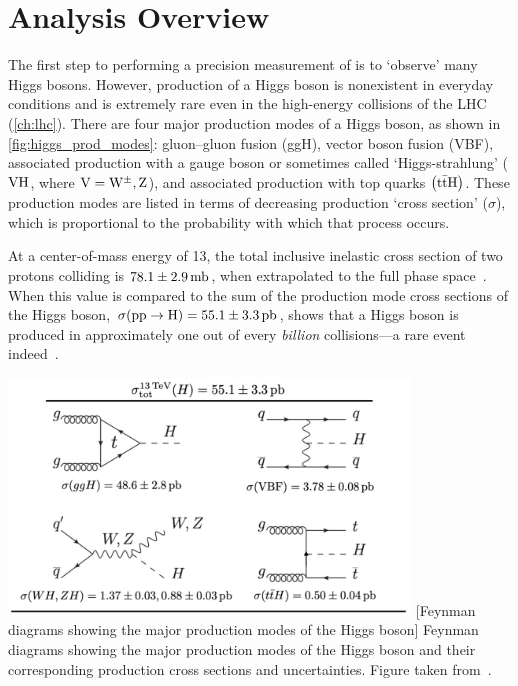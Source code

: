 \section{Analysis Overview}
\label{sec:analysis_overview}
The first step to performing a precision measurement of \mH is to `observe' many Higgs bosons.
However, production of a Higgs boson is nonexistent in everyday conditions and is extremely rare even in the high-energy \pp collisions of the LHC (\cref{ch:lhc}).
There are four major production modes of a Higgs boson, as shown in \cref{fig:higgs_prod_modes}:
gluon--gluon fusion (ggH),
vector boson fusion (VBF),
associated production with a gauge boson or sometimes called `Higgs-strahlung' ($\mathrm{V} \mathrm{H}$, where $\mathrm{V} = \mathrm{W}^\pm, \text{Z}$),
and associated production with top quarks $\left( \mathrm{t} \bar{\mathrm{t}} \mathrm{H} \right)$.
These production modes are listed in terms of decreasing production `cross section' ($\sigma$), which is proportional to the probability with which that process occurs.

At a center-of-mass energy of 13\TeV, the total inclusive inelastic cross section of two protons colliding is $78.1 \pm 2.9\,\text{mb}$, when extrapolated to the full phase space~\cite{ATLAS:2016ygv}.
When this value is compared to the sum of the production mode cross sections of the Higgs boson, $\sigma(\mathrm{p} \mathrm{p} \to \mathrm{H}) = 55.1 \pm 3.3\,\text{pb}$, shows that a Higgs boson is produced in approximately one out of every \emph{billion} \pp collisions---a rare event indeed~\cite{new_pdg_2022}.
\begin{multiFigure}
	\centering
		\includegraphics[width=0.8\textwidth]{figures/higgsmassmeas/higgs_prod_modes.png}
		[Feynman diagrams showing the major production modes of the Higgs boson]
		{Feynman diagrams showing the major production modes of the Higgs boson and their corresponding production cross sections and uncertainties.
		Figure taken from~\cite{new_pdg_2022}.}
	\label{fig:higgs_prod_modes}
\end{multiFigure} 

